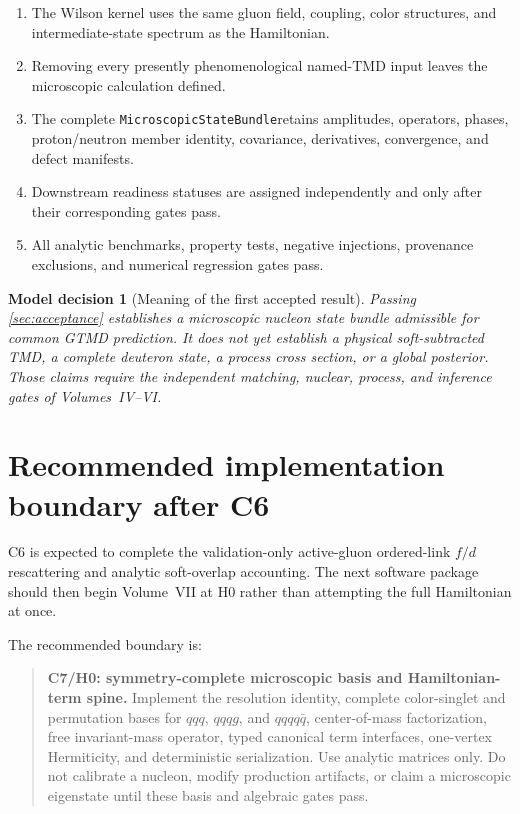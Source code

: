 \documentclass[11pt]{article}
\newtheorem{decision}[definition]{Model decision}
\newcommand{\StateBundle}{\texttt{MicroscopicStateBundle}}
\begin{document}
\begin{enumerate}
 \item The Wilson kernel uses the same gluon field, coupling, color structures,
 and intermediate-state spectrum as the Hamiltonian.
 \item Removing every presently phenomenological named-TMD input leaves the
 microscopic calculation defined.
 \item The complete \StateBundle retains amplitudes, operators, phases,
 proton/neutron member identity, covariance, derivatives, convergence, and
 defect manifests.
 \item Downstream readiness statuses are assigned independently and only after
 their corresponding gates pass.
 \item All analytic benchmarks, property tests, negative injections,
 provenance exclusions, and numerical regression gates pass.
\end{enumerate}

\begin{decision}[Meaning of the first accepted result]
Passing \cref{sec:acceptance} establishes a \emph{microscopic nucleon state
bundle admissible for common GTMD prediction}.  It does not yet establish a
physical soft-subtracted TMD, a complete deuteron state, a process cross
section, or a global posterior.  Those claims require the independent matching,
nuclear, process, and inference gates of Volumes~IV--VI.
\label{dec:meaning-accepted-result}
\end{decision}

\section{Recommended implementation boundary after C6}
\label{sec:next-package}

C6 is expected to complete the validation-only active-gluon ordered-link
\(f/d\) rescattering and analytic soft-overlap accounting.  The next software
package should then begin Volume~VII at H0 rather than attempting the full
Hamiltonian at once.

The recommended boundary is:
\begin{quote}
\textbf{C7/H0: symmetry-complete microscopic basis and Hamiltonian-term spine.}
Implement the resolution identity, complete color-singlet and permutation
bases for \(qqq\), \(qqqg\), and \(qqqq\bar q\), center-of-mass factorization,
free invariant-mass operator, typed canonical term interfaces, one-vertex
Hermiticity, and deterministic serialization.  Use analytic matrices only.
Do not calibrate a nucleon, modify production artifacts, or claim a microscopic
eigenstate until these basis and algebraic gates pass.
\end{quote}
\end{document}
